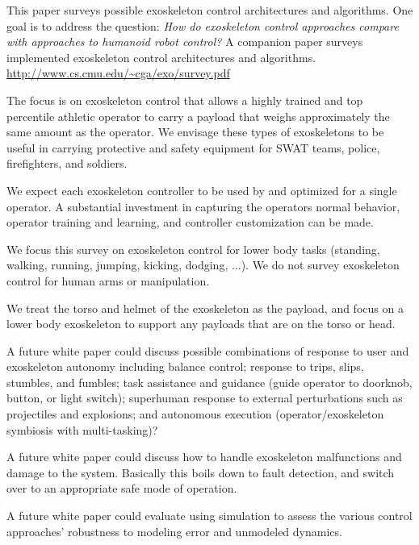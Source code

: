 \documentclass[letterpaper,12pt,fullpage]{article}
\begin{document}
This paper surveys possible exoskeleton control architectures and
algorithms.
One goal is to address the question:
{\it How do exoskeleton control approaches compare with 
approaches to humanoid robot control?}
A companion paper surveys implemented exoskeleton control architectures
and algorithms.\\
\url{http://www.cs.cmu.edu/~cga/exo/survey.pdf}

The focus is on exoskeleton control that allows a
highly trained and top percentile athletic 
operator to carry a payload that weighs approximately the same amount
as the operator. We envisage these types of exoskeletons to be useful
in carrying protective and safety equipment for SWAT teams, police,
firefighters, and soldiers. 

We expect each exoskeleton controller
to be used by and optimized for a single operator.
A substantial investment in capturing the operators normal behavior,
operator training and learning, and controller customization can be made.

We focus this survey on exoskeleton control for lower body tasks (standing, walking,
running, jumping, kicking, dodging, ...).
We do not survey exoskeleton control for human arms or manipulation. 

We treat the torso and helmet of the exoskeleton as the payload,
and focus on a lower body exoskeleton to support any payloads that
are on the torso or head.

A future white paper could discuss
possible combinations of response to user and exoskeleton
autonomy including balance control; response to trips, slips,
stumbles, and fumbles; task assistance and guidance (guide operator to
doorknob, button, or light switch); superhuman response to external
perturbations such as projectiles and explosions; and autonomous
execution (operator/exoskeleton symbiosis with multi-tasking)?

A future white paper could discuss how to handle exoskeleton
malfunctions and damage to the
system. Basically this boils down to fault detection, and switch over to
an appropriate safe mode of operation.

A future white paper could evaluate using simulation to assess
the various control approaches' robustness to modeling error and unmodeled
dynamics.
\end{document}
